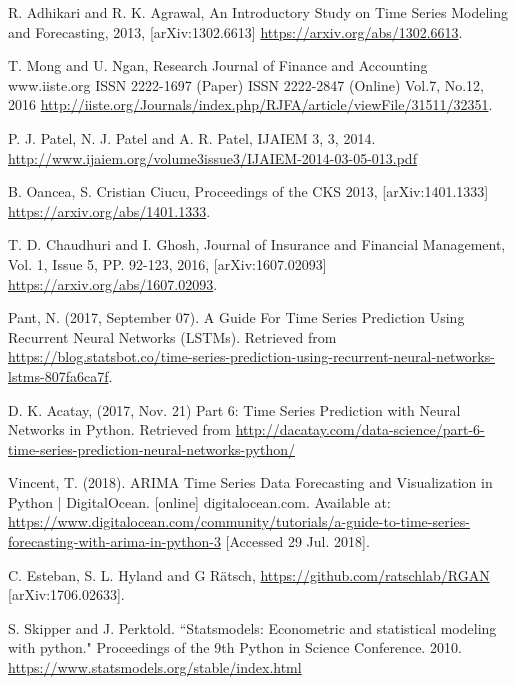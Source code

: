 \documentclass[10pt,a4paper]{article}
\begin{document}
\newpage
\begin{thebibliography}{9}

R. Adhikari and R. K. Agrawal, An Introductory Study on Time Series Modeling and Forecasting, 2013, [arXiv:1302.6613] \url{https://arxiv.org/abs/1302.6613}.

T. Mong and U. Ngan, Research Journal of Finance and Accounting www.iiste.org
ISSN 2222-1697 (Paper) ISSN 2222-2847 (Online)
Vol.7, No.12, 2016 \url{http://iiste.org/Journals/index.php/RJFA/article/viewFile/31511/32351}.

 P. J. Patel,  N. J. Patel and A. R. Patel, IJAIEM 3, 3, 2014. \url{http://www.ijaiem.org/volume3issue3/IJAIEM-2014-03-05-013.pdf}

 B. Oancea, S. Cristian Ciucu, Proceedings of the CKS 2013, [arXiv:1401.1333] \url{https://arxiv.org/abs/1401.1333}.

 T. D. Chaudhuri and I. Ghosh,	Journal of Insurance and Financial Management, Vol. 1, Issue 5, PP. 92-123, 2016,  [arXiv:1607.02093] \url{https://arxiv.org/abs/1607.02093}.

 Pant, N. (2017, September 07). A Guide For Time Series Prediction Using Recurrent Neural Networks (LSTMs). Retrieved from \url{https://blog.statsbot.co/time-series-prediction-using-recurrent-neural-networks-lstms-807fa6ca7f}.


 D. K. Acatay, (2017, Nov. 21) Part 6: Time Series Prediction with Neural Networks in Python. Retrieved from \url{http://dacatay.com/data-science/part-6-time-series-prediction-neural-networks-python/}

 Vincent, T. (2018). ARIMA Time Series Data Forecasting and Visualization in Python | DigitalOcean. [online] digitalocean.com. Available at: \url{https://www.digitalocean.com/community/tutorials/a-guide-to-time-series-forecasting-with-arima-in-python-3} [Accessed 29 Jul. 2018].

 C. Esteban, S. L. Hyland and G R\"{a}tsch, \url{https://github.com/ratschlab/RGAN} [arXiv:1706.02633]. 

 S. Skipper and J. Perktold. ``Statsmodels: Econometric and statistical modeling with python." Proceedings of the 9th Python in Science Conference. 2010. \url{https://www.statsmodels.org/stable/index.html}



\end{thebibliography}
\end{document}
